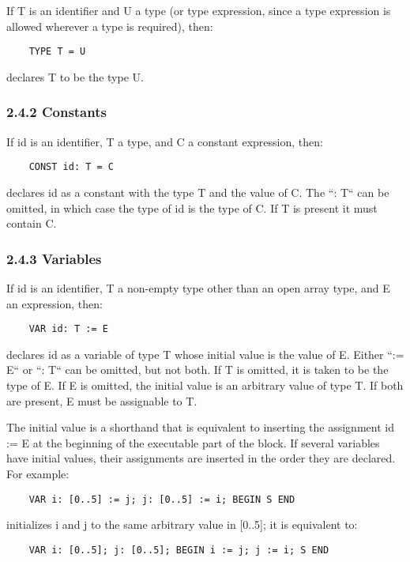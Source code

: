\documentclass[10pt]{article}
\begin{document}
  If T is an identifier and U a type (or type expression, since a type expression is allowed wherever a type is required), then: 
\begin{verbatim}
    TYPE T = U
\end{verbatim}
 declares T to be the type U. 


 
\subsubsection*{2.4.2 Constants}


  If id is an identifier, T a type, and C a constant expression, then: 
\begin{verbatim}
    CONST id: T = C
\end{verbatim}
 declares id as a constant with the type T and the value of C. The ``: T`` can be omitted, in which case the type of id is the type of C. If T is present it must contain C. 


 
\subsubsection*{2.4.3 Variables}


  If id is an identifier, T a non-empty type other than an open array type, and E an expression, then: 
\begin{verbatim}
    VAR id: T := E
\end{verbatim}
 declares id as a variable of type T whose initial value is the value of E. Either ``:= E`` or ``: T`` can be omitted, but not both. If T is omitted, it is taken to be the type of E. If E is omitted, the initial value is an arbitrary value of type T. If both are present,  E must be assignable to T. 


 The initial value is a shorthand that is equivalent to inserting the assignment id := E at the beginning of the executable part of the block. If several variables have initial values, their assignments are inserted in the order they are declared. For example: 
\begin{verbatim}
    VAR i: [0..5] := j; j: [0..5] := i; BEGIN S END
\end{verbatim}
 initializes i and j to the same arbitrary value in [0..5]; it is equivalent to: 
\begin{verbatim}
    VAR i: [0..5]; j: [0..5]; BEGIN i := j; j := i; S END
\end{verbatim}
\end{document}
